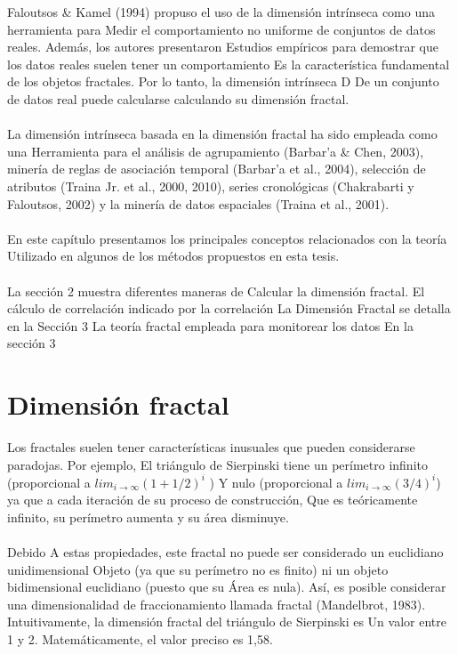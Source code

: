 Faloutsos & Kamel (1994) propuso el uso de la dimensión intrínseca como una herramienta para
Medir el comportamiento no uniforme de conjuntos de datos reales. Además, los autores presentaron
Estudios empíricos para demostrar que los datos reales suelen tener un comportamiento
Es la característica fundamental de los objetos fractales. Por lo tanto, la dimensión intrínseca D
De un conjunto de datos real puede calcularse calculando su dimensión fractal.
\\\\
La dimensión intrínseca basada en la dimensión fractal ha sido empleada como una Herramienta para el análisis de agrupamiento (Barbar'a & Chen, 2003), minería de reglas de asociación temporal
(Barbar'a et al., 2004), selección de atributos (Traina Jr. et al., 2000, 2010), series cronológicas
(Chakrabarti y Faloutsos, 2002) y la minería de datos espaciales (Traina et al., 2001).
\\\\
En este capítulo presentamos los principales conceptos relacionados con la teoría
Utilizado en algunos de los métodos propuestos en esta tesis.
\\\\
La sección 2 muestra diferentes maneras de
Calcular la dimensión fractal. El cálculo de correlación indicado por la correlación
La Dimensión Fractal se detalla en la Sección 3 La teoría fractal empleada para monitorear los datos En la sección 3

\section{Dimensión fractal}

Los fractales suelen tener características inusuales que pueden considerarse paradojas. Por ejemplo,
El triángulo de Sierpinski tiene un perímetro infinito (proporcional a $lim_{i\rightarrow\infty} (1+1/2)^i  $ )
Y nulo (proporcional a $lim_{i\rightarrow\infty} (3/4)^i $) ya que a cada iteración de su proceso de construcción,
Que es teóricamente infinito, su perímetro aumenta y su área disminuye.
\\\\
Debido
A estas propiedades, este fractal no puede ser considerado un euclidiano unidimensional
Objeto (ya que su perímetro no es finito) ni un objeto bidimensional euclidiano (puesto que su
Área es nula). Así, es posible considerar una dimensionalidad de fraccionamiento llamada fractal
(Mandelbrot, 1983). Intuitivamente, la dimensión fractal del triángulo de Sierpinski es
Un valor entre 1 y 2. Matemáticamente, el valor preciso es 1,58.

